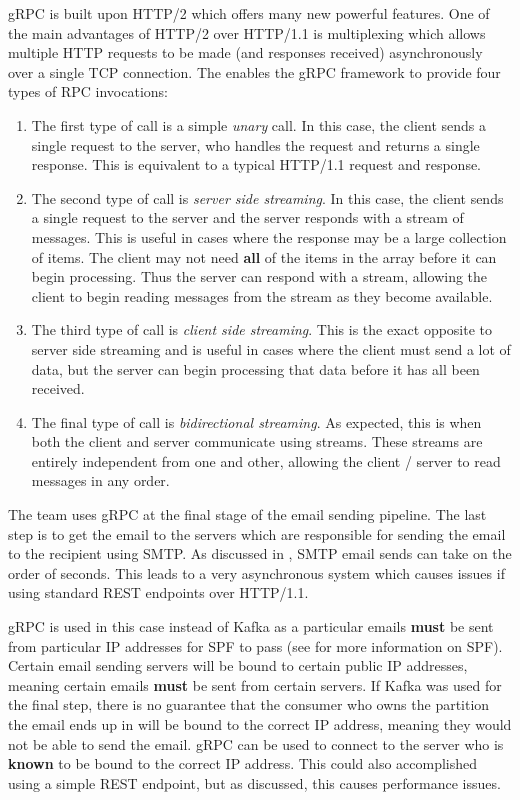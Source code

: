 gRPC is built upon HTTP/2 which offers many new powerful features. One of the main advantages of HTTP/2 over HTTP/1.1 is multiplexing which allows multiple HTTP requests to be made (and responses received) asynchronously over a single TCP connection. The enables the gRPC framework to provide four types of RPC invocations:

\begin{enumerate}
  \item{The first type of call is a simple \textit{unary} call. In this case, the client sends a single request to the server, who handles the request and returns a single response. This is equivalent to a typical HTTP/1.1 request and response.}
  \item{The second type of call is \textit{server side streaming}. In this case, the client sends a single request to the server and the server responds with a stream of messages. This is useful in cases where the response may be a large collection of items. The client may not need \textbf{all} of the items in the array before it can begin processing. Thus the server can respond with a stream, allowing the client to begin reading messages from the stream as they become available.}
  \item{The third type of call is \textit{client side streaming}. This is the exact opposite to server side streaming and is useful in cases where the client must send a lot of data, but the server can begin processing that data before it has all been received.}
  \item{The final type of call is \textit{bidirectional streaming}. As expected, this is when both the client and server communicate using streams. These streams are entirely independent from one and other, allowing the client / server to read messages in any order.}
\end{enumerate}

The \team{} team uses gRPC at the final stage of the email sending pipeline. The last step is to get the email to the servers which are responsible for sending the email to the recipient using SMTP. As discussed in , SMTP email sends can take on the order of seconds. This leads to a very asynchronous system which causes issues if using standard REST endpoints over HTTP/1.1. 

gRPC is used in this case instead of Kafka as a particular emails \textbf{must} be sent from particular IP addresses for SPF to pass (see  for more information on SPF). Certain email sending servers will be bound to certain public IP addresses, meaning certain emails \textbf{must} be sent from certain servers. If Kafka was used for the final step, there is no guarantee that the consumer who owns the partition the email ends up in will be bound to the correct IP address, meaning they would not be able to send the email. gRPC can be used to connect to the server who is \textbf{known} to be bound to the correct IP address. This could also accomplished using a simple REST endpoint, but as discussed, this causes performance issues.

